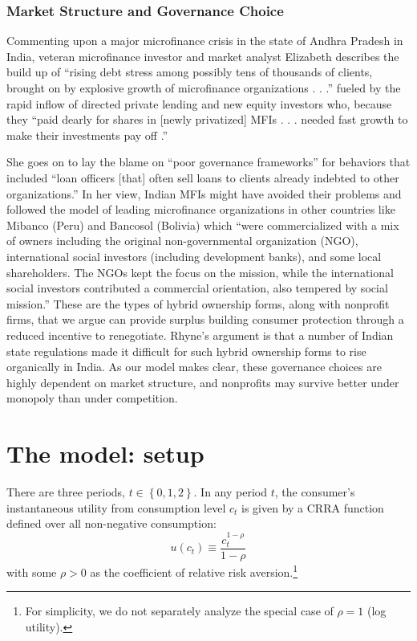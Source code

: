 \documentclass[11pt,english]{article}
\theoremstyle{plain}
\theoremstyle{definition}
\begin{document}
\subsubsection{Market Structure and Governance Choice}

Commenting upon a major microfinance crisis in the state of Andhra
Pradesh in India, veteran microfinance investor and market analyst
Elizabeth \citet{rhyne_microfinance:_2011} describes the build up
of ``rising debt stress among possibly tens of thousands of clients,
brought on by explosive growth of microfinance organizations . . .\textquotedblright{}
fueled by the rapid inflow of directed private lending and new equity
investors who, because they ``paid dearly for shares in {[}newly
privatized{]} MFIs . . . needed fast growth to make their investments
pay off .\textquotedblright{}

She goes on to lay the blame on ``poor governance frameworks\textquotedblright{}
for behaviors that included ``loan officers {[}that{]} often sell
loans to clients already indebted to other organizations.'' In her
view, Indian MFIs might have avoided their problems and followed the
model of leading microfinance organizations in other countries like
Mibanco (Peru) and Bancosol (Bolivia) which ``were commercialized
with a mix of owners including the original non-governmental organization
(NGO), international social investors (including development banks),
and some local shareholders. The NGOs kept the focus on the mission,
while the international social investors contributed a commercial
orientation, also tempered by social mission.'' These are the types
of hybrid ownership forms, along with nonprofit firms, that we argue
can provide surplus building consumer protection through a reduced
incentive to renegotiate. Rhyne's argument is that a number of Indian
state regulations made it difficult for such hybrid ownership forms
to rise organically in India. As our model makes clear, these governance
choices are highly dependent on market structure, and nonprofits may
survive better under monopoly than under competition.

\section{The model: setup}

There are three periods, $t\in\left\{ 0,1,2\right\} $. In any period
$t$, the consumer's instantaneous utility from consumption level
$c_{t}$ is given by a CRRA function defined over all non-negative
consumption:
\begin{equation}
u\left(c_{t}\right)\equiv\frac{c_{t}^{1-\rho}}{1-\rho}
\end{equation}
with some $\rho>0$ as the coefficient of relative risk aversion.\footnote{For simplicity, we do not separately analyze the special case of $\rho=1$
(log utility).} 
\end{document}
